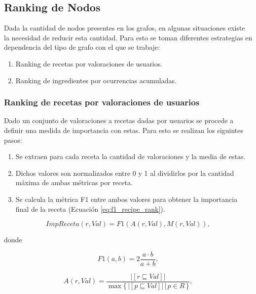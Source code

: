 \documentclass[
	a4paper, %
	10pt, %
	unnumberedsections, %
	twoside, %
]{LTJournalArticle}
\begin{document}
\subsection{Ranking de Nodos}

Dada la cantidad de nodos presentes en los grafos, en algunas situaciones existe la necesidad de reducir esta
cantidad. Para esto se toman diferentes estrategias en dependencia del tipo de grafo con el que se trabaje:

\begin{enumerate}
	\item Ranking de recetas por valoraciones de usuarios.
	\item Ranking de ingredientes por ocurrencias acumuladas.
\end{enumerate}

\subsubsection{Ranking de recetas por valoraciones de usuarios}

Dado un conjunto de valoraciones a recetas dadas por usuarios se procede a definir 
una medida de importancia con estas. Para esto se realizan los siguintes pasos:

\begin{enumerate}
	\item Se extraen para cada receta la cantidad de valoraciones y la media de estas.
	\item Dichos valores son normalizados entre 0 y 1 al dividirlos por la cantidad máxima de ambas métricas por receta.
	\item Se calcula la métrica F1 entre ambos valores para obtener la importancia final de la receta (Ecuación \ref{eq:f1_recipe_rank}).
\end{enumerate}

\begin{equation}
	ImpReceta(r, Val) = F1(A(r, Val), M(r, Val)),
	\label{eq:f1_recipe_rank}
\end{equation}

donde

\begin{equation*}
	F1(a, b) = 2 \frac{a · b}{a + b},
\end{equation*}

\begin{equation*}
	A(r, Val) = \frac{|[r \sqsubseteq Val]|}{\max \{\,|[p \sqsubseteq Val]| \, \vert \, p \in R \, \}},
\end{equation*}
\end{document}
